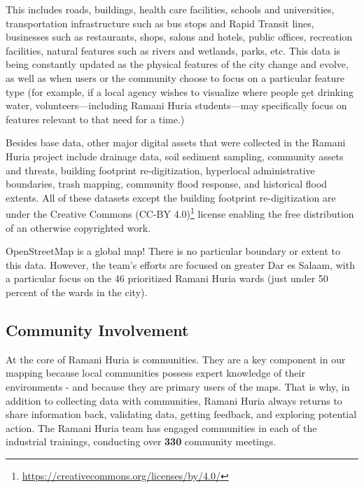 \documentclass[a4paper,12pt,twoside]{article}
\begin{document}
\begin{multicols}{2}
This includes roads, buildings, health care facilities, schools and universities, transportation infrastructure such as bus stops and Rapid Transit lines, businesses such as restaurants, shops, salons and hotels, public offices, recreation facilities, natural features such as rivers and wetlands, parks, etc. This data is being constantly updated as the physical features of the city change and evolve, as well as when users or the community choose to focus on a particular feature type (for example, if a local agency wishes to visualize where people get drinking water, volunteers—including Ramani Huria students—may specifically focus on features relevant to that need for a time.)

Besides base data, other major digital assets that were collected in the Ramani Huria project include drainage data, soil sediment sampling, community assets and threats, building footprint re-digitization, hyperlocal administrative boundaries, trash mapping, community flood response, and historical flood extents. All of these datasets except the building footprint re-digitization are under the Creative Commons (CC-BY 4.0)\footnote{\url{https://creativecommons.org/licenses/by/4.0/}} license enabling the free distribution of an otherwise copyrighted work.

OpenStreetMap is a global map! There is no particular boundary or extent to this data. However, the team’s efforts are focused on greater Dar es Salaam, with a particular focus on the 46 prioritized Ramani Huria wards (just under 50 percent of the wards in the city).
\end{multicols}

\subsection{Community Involvement}
\begin{multicols}{2}
At the core of Ramani Huria is communities. They are a key component in our mapping because local communities possess expert knowledge of their environments - and because they are primary users of the maps. That is why, in addition to collecting data with communities, Ramani Huria always returns to share information back, validating data, getting feedback, and exploring potential action. The Ramani Huria team has engaged communities in each of the industrial trainings, conducting over \textbf{330}  community meetings.
\end{multicols}
\medskip
\end{document}
